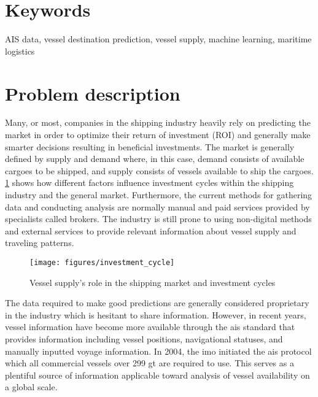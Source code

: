 \section{Keywords}

AIS data, vessel destination prediction, vessel supply, machine learning, maritime logistics

\section{Problem description}
\label{sec:problem_desc}

Many, or most, companies in the shipping industry heavily rely on predicting the market in order to optimize their return of investment (ROI) and generally make smarter decisions resulting in beneficial investments. The market is generally defined by supply and demand where, in this case, demand consists of available cargoes to be shipped, and supply consists of vessels available to ship the cargoes. \cref{fig:maritime_economics} shows how different factors influence investment cycles within the shipping industry and the general market. Furthermore, the current methods for gathering data and conducting analysis are normally manual and paid services provided by specialists called brokers. The industry is still prone to using non-digital methods and external services to provide relevant information about vessel supply and traveling patterns.

\begin{figure}[htbp]
    \centering
    \texttt{[image: figures/investment\_cycle]}
    \caption{Vessel supply’s role in the shipping market and investment cycles \parencite{stopford2008}}
    \label{fig:maritime_economics}
\end{figure}

The data required to make good predictions are generally considered proprietary in the industry which is hesitant to share information. However, in recent years, vessel information have become more available through the \acrshort{ais} standard that provides information including vessel positions, navigational statuses, and manually inputted \gls{voyage} information. In 2004, the \acrfull{imo} initiated the \acrshort{ais} protocol which all commercial vessels over 299 \acrfull{gt} are required to use. This serves as a plentiful source of information applicable toward analysis of vessel availability on a global scale.

